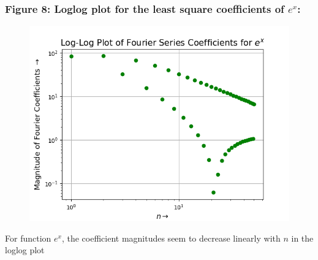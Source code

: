 \documentclass[12pt, a4paper]{article}
\begin{document}
\subsubsection{Figure 8: Loglog plot for the least square coefficients of $e^{x}$:}
\vspace*{-0.5cm}
\begin{figure}[H]
    \centering
    \includegraphics[scale = 0.75]{Figure_8.png}
    \label{fig:sample}
\end{figure}
\vspace*{-0.5cm}
\begin{center}
    For function $e^{x}$, the coefficient magnitudes seem to decrease linearly with $n$ in the loglog plot
\end{center}
\end{document}
